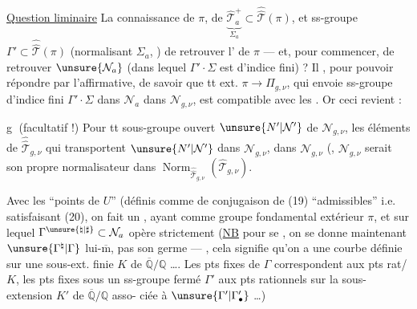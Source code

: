 \uline{Question liminaire} La connaissance de
$\pi$, de $\underbrace{\widehat{\mathcal T}_a^+}_{\Sigma_a}
\subset\widehat{\widehat{\mathcal T}}(\pi)$, et  ss-groupe
$\Gamma'\subset\widehat{\widehat{\mathcal T}}(\pi)$
(normalisant $\Sigma_a$, )
 de retrouver l' de $\pi$
--- et, pour commencer, de retrouver
$\unsure{\mathcal N_a}$ (dans lequel $\Gamma'\cdot\Sigma$ est d'indice
fini) ?  Il , pour pouvoir
répondre par l'affirmative, de savoir
que tt  ext. $\pi\longrightarrow\Pi_{g,\nu}$,
qui envoie 
 ss-groupe d'indice
fini $\Gamma'\cdot\Sigma$ dans $\mathcal N_a$ dans $\mathcal N_{g,\nu}$,
est compatible avec les .
Or ceci revient  :

\textcircled{g} (facultatif  !)
 Pour tt sous-groupe
ouvert $\unsure{N'|\mathcal N'}$ de $\mathcal N_{g,\nu}$,
les éléments de $\widehat{\widehat{\mathcal T}}_{g,\nu}$
qui transportent
$\unsure{N'|\mathcal N'}$ dans $\mathcal N_{g,\nu}$,  dans $\mathcal N_{g,\nu}$
(,
$\mathcal N_{g,\nu}$ serait son propre normalisateur
dans $\operatorname{Norm}_{\widehat{\widehat{\mathcal T}}_{g,\nu}}
(\widehat{\mathcal T}_{g,\nu})$.

Avec les ``points de $U$'' (définis comme 
de conjugaison de  (19)
``admissibles'' i.e. satisfaisant (20), on
fait un , ayant comme
groupe fondamental extérieur $\pi$, et sur
lequel $\Gamma^{\unsure{\natural|\sharp}}\subset\mathcal N_a$ opère strictement
(\uline{NB} pour se , on se donne
maintenant $\unsure{\Gamma^{\natural}|\Gamma}$ lui-$\overline{\mathrm m}$, pas  son
germe --- , cela signifie
qu'on a une courbe définie sur une
sous-ext. finie $K$ de $\overline{\mathbb Q}/\mathbb Q$ \ldots\unsure{\}|)}.
Les pts fixes de $\Gamma$ correspondent
aux pts rat/$K$, les pts fixes sous un
ss-groupe fermé $\Gamma'$ aux pts rationnels
sur la sous-extension $K'$ de $\overline{\mathbb Q}/\mathbb Q$ asso-
ciée à $\unsure{\Gamma'|\Gamma_{\bullet}'}$ \ldots)


